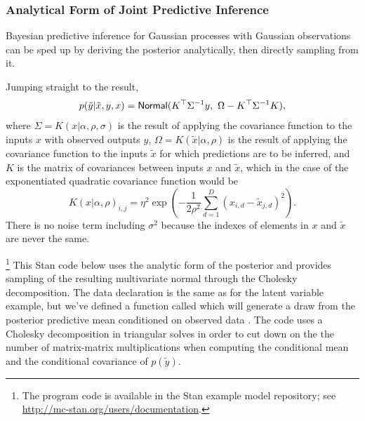 \subsubsection{Analytical Form of Joint Predictive Inference}

Bayesian predictive inference for Gaussian processes with Gaussian observations
can be sped up by deriving the posterior analytically, then directly sampling
from it.

Jumping straight to the result,
\[
p(\tilde{y}|\tilde{x},y,x)
=
\mbox{\sf Normal}(K^{\top}\Sigma^{-1}y,\
                \Omega - K^{\top}\Sigma^{-1}K),
\]
where $\Sigma = K(x | \alpha, \rho, \sigma)$ is the result of applying the covariance
function to the inputs $x$ with observed outputs $y$, $\Omega =
K(\tilde{x} | \alpha, \rho)$ is the result of applying the covariance function to the
inputs $\tilde{x}$ for which predictions are to be inferred, and $K$
is the matrix of covariances between inputs $x$ and $\tilde{x}$, which
in the case of the exponentiated quadratic covariance function
would be
\[ K(x | \alpha, \rho)_{i, j} = \eta^2 \exp(-\dfrac{1}{2 \rho^2}
\sum_{d=1}^D (x_{i,d} - \tilde{x}_{j,d})^2).  \]
There is no noise term including $\sigma^2$ because the indexes of
elements in $x$ and $\tilde{x}$ are never the same.

%
\footnote{The program code is available in the Stan example model repository;
see \url{http://mc-stan.org/users/documentation}.}
%
This Stan code below uses the analytic form of the posterior and provides
sampling of the resulting multivariate normal through the Cholesky
decomposition. The data declaration is the same as for the latent variable
example, but we've defined a function called \code{gp\_pred\_rng} which will
generate a draw from the posterior predictive mean conditioned on observed data
\code{y1}. The code uses a Cholesky decomposition in triangular solves in order
to cut down on the the number of matrix-matrix multiplications when computing
the conditional mean and the conditional covariance of $p(\tilde{y})$.

